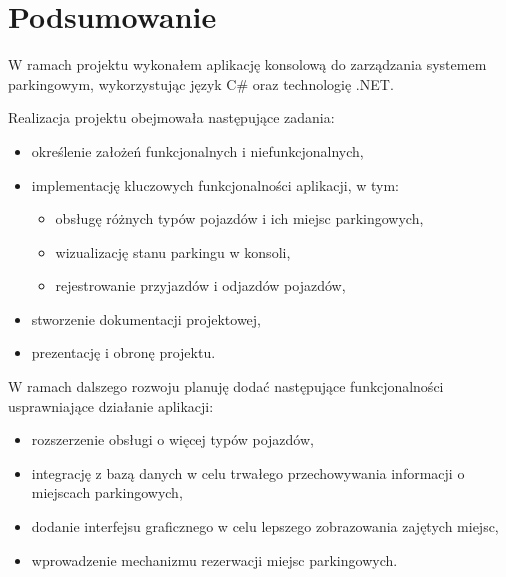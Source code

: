 ﻿%
\chapter{Podsumowanie}

W ramach projektu wykonałem aplikację konsolową do zarządzania systemem parkingowym, wykorzystując język C\# oraz technologię .NET.

Realizacja projektu obejmowała następujące zadania:
\begin{itemize}
    \item określenie założeń funkcjonalnych i niefunkcjonalnych,
    \item implementację kluczowych funkcjonalności aplikacji, w tym:
    \begin{itemize}
        \item obsługę różnych typów pojazdów i ich miejsc parkingowych,
        \item wizualizację stanu parkingu w konsoli,
        \item rejestrowanie przyjazdów i odjazdów pojazdów,
    \end{itemize}
    \item stworzenie dokumentacji projektowej,
    \item prezentację i obronę projektu.
\end{itemize}

W ramach dalszego rozwoju planuję dodać następujące funkcjonalności usprawniające działanie aplikacji:
\begin{itemize}
    \item rozszerzenie obsługi o więcej typów pojazdów,
    \item integrację z bazą danych w celu trwałego przechowywania informacji o miejscach parkingowych,
    \item dodanie interfejsu graficznego w celu lepszego zobrazowania zajętych miejsc,
    \item wprowadzenie mechanizmu rezerwacji miejsc parkingowych.
\end{itemize}





